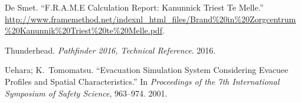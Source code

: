 \documentclass{style/llncs}
\begin{document}
{\begin{thebibliography}{36}
De Smet. \textquotedblleft{}F.R.A.M.E Calculation Report: Kanunnick Triest Te Melle.\textquotedblright{} \href{http://www.framemethod.net/indexnl_html_files/Brand\%2520in\%2520Zorgcentrum\%2520Kanunnik\%2520Triest\%2520te\%2520Melle.pdf}{{\ttfamily http://\hspace{0pt}www.\hspace{0pt}framemethod.\hspace{0pt}net/\hspace{0pt}indexnl\_\hspace{0pt}html\_\hspace{0pt}files/\hspace{0pt}Brand\hspace{0pt}\%20in\hspace{0pt}\%20Zorgcentrum\hspace{0pt}\%20Kanunnik\hspace{0pt}\%20Triest\hspace{0pt}\%20te\hspace{0pt}\%20Melle.\hspace{0pt}pdf}}.\label{30}%

Thunderhead. \emph{Pathfinder 2016, Technical Reference}. 2016.\label{14}%

Uehara; K.~Tomomatsu. \textquotedblleft{}Evacuation Simulation System Considering Evacuee Profiles and Spatial Characteristics.\textquotedblright{} In \emph{Proceedings of the 7th International Symposium of Safety Science}, 963–974. 2001.\label{12}%
\par%
\end{thebibliography}}%
\end{document}
